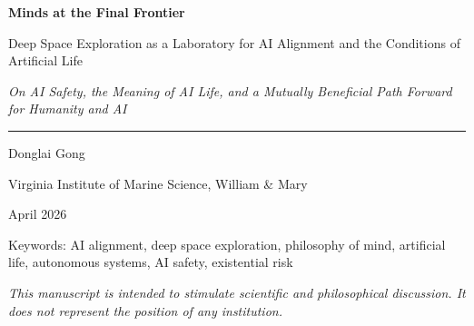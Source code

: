 \begin{titlepage}
\centering
\thispagestyle{empty}
\vspace*{\fill}
{\fontsize{30}{36}\selectfont\bfseries Minds at the Final Frontier\par}
\vspace{1.4em}
{\Large Deep Space Exploration as a Laboratory for AI Alignment and the Conditions of Artificial Life\par}
\vspace{1.0em}
{\large\itshape On AI Safety, the Meaning of AI Life, and a Mutually Beneficial Path Forward for Humanity and AI\par}
\vspace{2.4em}
{\rule{0.32\textwidth}{0.4pt}}\par
\vspace{1.8em}
{\large Donglai Gong\par}
\vspace{0.5em}
{Virginia Institute of Marine Science, William \& Mary\par}
\vspace{0.6em}
{\small April 2026\par}
\vspace{2.6em}
{\footnotesize Keywords: AI alignment, deep space exploration, philosophy of mind, artificial life, autonomous systems, AI safety, existential risk\par}
\vspace{\fill}
{\footnotesize\itshape This manuscript is intended to stimulate scientific and philosophical discussion. It does not represent the position of any institution.\par}
\vspace*{\fill}
\end{titlepage}
